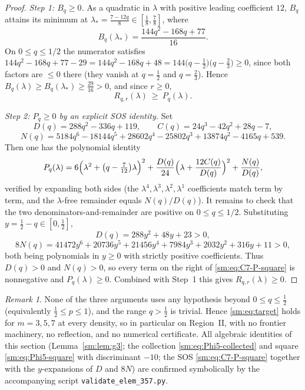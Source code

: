 \documentclass[11pt]{article}
\theoremstyle{remark}
\newtheorem{remark}[theorem]{Remark}
\theoremstyle{plain}
\theoremstyle{plain}
\begin{document}
\begin{proof}
\emph{Step 1: $B_q\ge0$.}  As a quadratic in $\lambda$ with positive leading
coefficient $12$, $B_q$ attains its minimum at
$\lambda_*=\tfrac{7-12q}{8}\in[\tfrac18,\tfrac78]$, where
\[
   B_q(\lambda_*)=\frac{144q^{2}-168q+77}{16}.
\]
On $0\le q\le1/2$ the numerator satisfies
$144q^{2}-168q+77-29=144q^{2}-168q+48=144\bigl(q-\tfrac12\bigr)\bigl(q-\tfrac23\bigr)\ge0$,
since both factors are $\le0$ there (they vanish at $q=\tfrac12$ and
$q=\tfrac23$).  Hence $B_q(\lambda)\ge B_q(\lambda_*)\ge\tfrac{29}{16}>0$, and
since $r\ge0$,
\[
   R_{q,r}(\lambda)\ \ge\ P_q(\lambda).
\]

\emph{Step 2: $P_q\ge0$ by an explicit SOS identity.}  Set
\[
   D(q)=288q^{2}-336q+119,\qquad
   C(q)=24q^{3}-42q^{2}+28q-7,
\]
\[
   N(q)=5184q^{6}-18144q^{5}+28602q^{4}-25802q^{3}+13874q^{2}-4165q+539 .
\]
Then one has the polynomial identity
\begin{equation}\label{sm:eq:C7-P-square}
   P_q(\lambda)=6\Bigl(\lambda^{2}+\bigl(q-\tfrac{7}{12}\bigr)\lambda\Bigr)^{2}
   +\frac{D(q)}{24}\Bigl(\lambda+\frac{12C(q)}{D(q)}\Bigr)^{2}
   +\frac{N(q)}{D(q)},
\end{equation}
verified by expanding both sides (the $\lambda^4,\lambda^3,\lambda^2,\lambda^1$
coefficients match term by term, and the $\lambda$-free remainder equals
$N(q)/D(q)$).  It remains to check that the two denominators-and-remainder are
positive on $0\le q\le1/2$.  Substituting $y=\tfrac12-q\in[0,\tfrac12]$,
\[
   D(q)=288y^{2}+48y+23>0,
\]
\[
   8N(q)=41472y^{6}+20736y^{5}+21456y^{4}+7984y^{3}+2032y^{2}+316y+11>0,
\]
both being polynomials in $y\ge0$ with strictly positive coefficients.  Thus
$D(q)>0$ and $N(q)>0$, so every term on the right of
\eqref{sm:eq:C7-P-square} is nonnegative and $P_q(\lambda)\ge0$.  Combined with
Step~1 this gives $R_{q,r}(\lambda)\ge0$.
\end{proof}

\begin{remark}\label{sm:rmk:allp}
None of the three arguments uses any hypothesis beyond $0\le q\le\tfrac12$
(equivalently $\tfrac12\le p\le1$), and the range $q>\tfrac12$ is trivial.
Hence \eqref{sm:eq:target} holds for $m=3,5,7$ at every density, so in
particular on Region~II, with no frontier machinery, no reflection, and no
numerical certificate.  All algebraic identities of this section
(Lemma~\ref{sm:lem:g3}; the collection \eqref{sm:eq:Phi5-collected} and square
\eqref{sm:eq:Phi5-square} with discriminant $-10$; the SOS
\eqref{sm:eq:C7-P-square} together with the $y$-expansions of $D$ and $8N$) are
confirmed symbolically by the accompanying script
\texttt{validate\_elem\_357.py}.
\end{remark}
\end{document}
